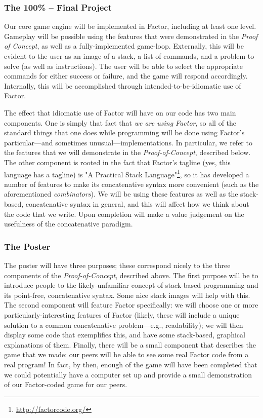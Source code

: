 \documentclass{sig-alternate}
\begin{document}
\subsubsection*{The 100\% -- Final Project} 
Our core game engine will be implemented in Factor, including at least one level. Gameplay will be possible using the features that were demonstrated in the \textit{Proof of Concept}, as well as a fully-implemented game-loop. Externally, this will be evident to the user as an image of a stack, a list of commands, and a problem to solve (as well as instructions). The user will be able to select the appropriate commands for either success or failure, and the game will respond accordingly. Internally, this will be accomplished through intended-to-be-idiomatic use of Factor.

The effect that idiomatic use of Factor will have on our code has two main components. One is simply that fact that \textit{we are using Factor}, so all of the standard things that one does while programming will be done using Factor's particular---and sometimes unusual---implementations. In particular, we refer to the features that we will demonstrate in the \textit{Proof-of-Concept}, described below. The other component is rooted in the fact that Factor's tagline (yes, this language has a tagline) is "A Practical Stack Language"\footnote{\url{http://factorcode.org/}}, so it has developed a number of features to make its concatenative syntax more convenient (such as the aforementioned \textit{combinators}). We will be using these features as well as the stack-based, concatenative syntax in general, and this will affect how we think about the code that we write. Upon completion will make a value judgement on the usefulness of the concatenative paradigm.

\subsubsection*{The Poster}
The poster will have three purposes; these correspond nicely to the three components of the \textit{Proof-of-Concept}, described above. The first purpose will be to introduce people to the likely-unfamiliar concept of stack-based programming and its point-free, concatenative syntax. Some nice stack images will help with this. The second component will feature Factor specifically: we will choose one or more particularly-interesting features of Factor (likely, these will include a unique solution to a common concatenative problem---e.g., readability); we will then display some code that exemplifies this, and have some stack-based, graphical explanations of them. Finally, there will be a small component that describes the game that we made: our peers will be able to see some real Factor code from a real program! In fact, by then, enough of the game will have been completed that we could potentially have a computer set up and provide a small demonstration of our Factor-coded game for our peers.
\end{document}
